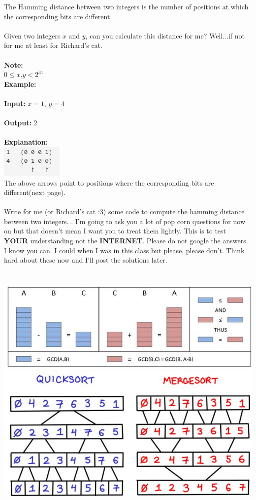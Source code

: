 \documentclass[12pt]{article}
\begin{document}
The Hamming distance between two integers is the number of positions at which the corresponding bits are different.\\\\
Given two integers $x$ and $y$, can you calculate this distance for me? Well...if not for me at least for Richard's cat.\\\\
\textbf{Note:}\\
$0 \leq x$,$y < 2^{31}$\\
\textbf{Example:}\\\\
\textbf{Input:} $x = 1$, $y = 4$\\\\
\textbf{Output: } $2$\\\\
\textbf{Explanation: }\\
\noindent \includegraphics{hamming.jpg}\\
The above arrows point to positions where the corresponding bits are different(next page).\\\\
Write for me (or Richard's cat :3) some code to compute the hamming distance between two integers.
. I'm going to ask you a lot of pop corn questions for now on but that doesn't mean I want you to treat them lightly. This is to test \textbf{YOUR} understanding not the \textbf{INTERNET}. Please do not google the answers. I know you can. I could when I was in this class but please, please don't. Think hard about these now and I'll post the solutions later.\\\\\
\noindent \includegraphics[scale = 0.5]{ea.jpg}
\noindent \includegraphics[scale = 0.35]{qsms.jpg}
\end{document}

